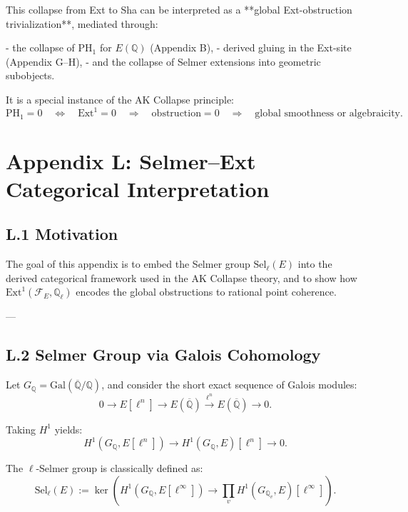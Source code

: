 This collapse from Ext to Sha can be interpreted as a **global Ext-obstruction trivialization**, mediated through:

- the collapse of PH$_1$ for \( E(\mathbb{Q}) \) (Appendix B),
- derived gluing in the Ext-site (Appendix G–H),
- and the collapse of Selmer extensions into geometric subobjects.

It is a special instance of the AK Collapse principle:  
\[
\mathrm{PH}_1 = 0 \quad \Leftrightarrow \quad \mathrm{Ext}^1 = 0 \quad \Rightarrow \quad \text{obstruction} = 0 \quad \Rightarrow \quad \text{global smoothness or algebraicity}.
\]



\section*{Appendix L: Selmer--Ext Categorical Interpretation}

\subsection*{L.1 Motivation}

The goal of this appendix is to embed the Selmer group \( \mathrm{Sel}_\ell(E) \)  
into the derived categorical framework used in the AK Collapse theory,  
and to show how \( \mathrm{Ext}^1(\mathcal{F}_E, \mathbb{Q}_\ell) \) encodes the global obstructions to rational point coherence.

---

\subsection*{L.2 Selmer Group via Galois Cohomology}

Let \( G_\mathbb{Q} = \mathrm{Gal}(\overline{\mathbb{Q}}/\mathbb{Q}) \), and consider the short exact sequence of Galois modules:
\[
0 \longrightarrow E[\ell^n] \longrightarrow E(\overline{\mathbb{Q}}) \xrightarrow{\ell^n} E(\overline{\mathbb{Q}}) \longrightarrow 0.
\]

Taking \( H^1 \) yields:
\[
H^1(G_\mathbb{Q}, E[\ell^n]) \longrightarrow H^1(G_\mathbb{Q}, E)[\ell^n] \longrightarrow 0.
\]

The \( \ell \)-Selmer group is classically defined as:
\[
\mathrm{Sel}_\ell(E) := \ker\left(H^1(G_\mathbb{Q}, E[\ell^\infty]) \to \prod_v H^1(G_{\mathbb{Q}_v}, E)[\ell^\infty] \right).
\]

